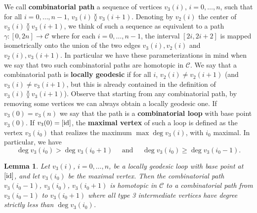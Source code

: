 \documentclass[reqno,oneside,11pt]{amsart}
\theoremstyle{plain}
\newtheorem{lemma}[theorem]{Lemma}
\theoremstyle{definition}
\newcommand{\Comp}{\mathcal{C}}
\newcommand{\id}{\text{\rm id}}
\renewcommand{\ne}{\between}
\renewcommand{\ge}{\geqslant}
\begin{document}
We call \textbf{combinatorial path} a sequence of vertices $v_3(i)$, $i = 0, \dots, n$,
such that for all $i = 0, \dots, n-1$, $v_3(i) \ne v_3(i+1)$.
Denoting by $v_2(i)$ the center of $v_3(i) \ne v_3(i+1)$, we think of such a sequence as equivalent to a path $\gamma\colon [0,2n] \to \Comp$ where for each $i = 0, \dots, n-1$, the interval $[2i, 2i + 2]$ is mapped isometrically onto the union of the two edges $v_3(i),v_2(i)$ and $v_2(i),v_3(i+1)$.
In particular we have these parameterizations in mind when we say that two such
combinatorial paths are homotopic in $\Comp$.
We say that a combinatorial path is \textbf{locally geodesic} if for all $i$, $v_2(i) \neq v_2(i+1)$ (and $v_3(i) \neq v_3(i+ 1)$, but this is already contained in the definition of $v_3(i) \ne v_3(i+ 1)$).
Observe that starting from any combinatorial path, by removing some vertices we can always obtain a
locally geodesic one.
If $v_3(0) = v_3(n)$ we say that the path is a \textbf{combinatorial loop} with base
point $v_3(0)$.
If $v_3(0) = [\id]$, the \textbf{maximal vertex} of such a loop is defined as
the vertex $v_3(i_0)$ that realizes the maximum $\max \deg v_3(i)$, with $i_0$
maximal.
In particular, we have
$$\deg v_3(i_0) > \deg v_3(i_0+1) \quad \text{ and } \quad \deg v_3(i_0) \ge
\deg v_3(i_0-1).$$


\begin{lemma} \label{lem:local homotopy}
Let $v_3(i)$, $i=0,\dots, n$, be a locally geodesic loop with base point at
$[\id]$, and let $v_3(i_0)$ be the maximal vertex.
Then the combinatorial path $v_3(i_0-1)$, $v_3(i_0)$, $v_3(i_0+1)$ is homotopic in
$\Comp$ to a combinatorial path from $v_3(i_0-1)$ to $v_3(i_0+1)$ where all
type 3 intermediate vertices have degree strictly less than $\deg v_3(i_0)$.
\end{lemma}
\end{document}
